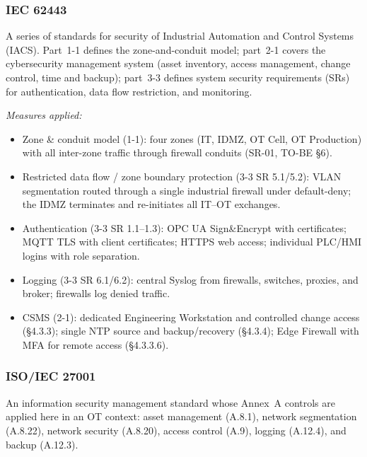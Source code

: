 \documentclass[11pt,a4paper]{article}
\begin{document}
\subsubsection{IEC 62443}
A series of standards for security of Industrial Automation and Control Systems
(IACS). Part~1-1 defines the zone-and-conduit model; part~2-1 covers the
cybersecurity management system (asset inventory, access management, change
control, time and backup); part~3-3 defines system security requirements (SRs)
for authentication, data flow restriction, and monitoring.

\textit{Measures applied:}
\begin{itemize}[nosep]
  \item Zone \& conduit model (1-1): four zones (IT, IDMZ, OT Cell, OT
      Production) with all inter-zone traffic through firewall conduits (SR-01,
        TO-BE \S6).

    \item Restricted data flow / zone boundary protection (3-3 SR 5.1/5.2):
        VLAN segmentation routed through a single industrial firewall under
        default-deny; the IDMZ terminates and re-initiates all IT--OT
        exchanges.

    \item Authentication (3-3 SR 1.1--1.3): OPC UA Sign\&Encrypt with
        certificates; MQTT TLS with client certificates; HTTPS web access;
        individual PLC/HMI logins with role separation.

    \item Logging (3-3 SR 6.1/6.2): central Syslog from firewalls, switches,
        proxies, and broker; firewalls log denied traffic.

    \item CSMS (2-1): dedicated Engineering Workstation and controlled change
        access (\S4.3.3); single NTP source and backup/recovery (\S4.3.4); Edge
        Firewall with MFA for remote access (\S4.3.3.6).
\end{itemize}

\subsubsection{ISO/IEC 27001}
An information security management standard whose Annex~A controls are applied
here in an OT context: asset management (A.8.1), network segmentation (A.8.22),
network security (A.8.20), access control (A.9), logging (A.12.4), and backup
(A.12.3).
\end{document}
